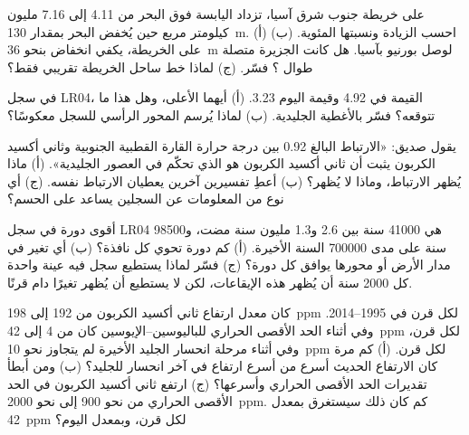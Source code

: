 \begin{exercise}[$\star\star$]\label{exo:g12:past-climates:9}
على خريطة جنوب شرق آسيا، تزداد اليابسة فوق البحر من 4.11 إلى
7.16 مليون كيلومتر مربع حين يُخفض البحر بمقدار \qty{130}{m}.
(أ) احسب الزيادة ونسبتها المئوية. (ب) على الخريطة، يكفي انخفاض بنحو
\qty{36}{m} لوصل بورنيو بآسيا. هل كانت الجزيرة متصلة طوال ؟ فسّر. (ج) لماذا خط ساحل الخريطة تقريبي
فقط؟
\end{exercise}

\begin{exercise}[$\star\star$]\label{exo:g12:past-climates:10}
في سجل LR04، القيمة في 
\qty{4.92}{\permil} وقيمة اليوم \qty{3.23}{\permil}. (أ) أيهما الأعلى،
وهل هذا ما تتوقعه؟ فسّر بالأغطية الجليدية. (ب) لماذا يُرسم
المحور الرأسي للسجل معكوسًا؟
\end{exercise}

\begin{exercise}[$\star\star$]\label{exo:g12:past-climates:11}
يقول صديق: «الارتباط البالغ 0.92 بين درجة حرارة القارة القطبية الجنوبية
وثاني أكسيد الكربون يثبت أن ثاني أكسيد الكربون هو الذي تحكّم في العصور الجليدية».
(أ) ماذا يُظهر الارتباط، وماذا لا يُظهر؟ (ب) أعطِ تفسيرين
آخرين يعطيان الارتباط نفسه. (ج) أي نوع من
المعلومات عن السجلين يساعد على الحسم؟
\end{exercise}

\begin{exercise}[$\star\star\star$]\label{exo:g12:past-climates:12}
أقوى دورة في سجل LR04 هي \num{41000} سنة بين 2.6
و1.3 مليون سنة مضت، و\num{98500} سنة على مدى \num{700000} السنة
الأخيرة. (أ) كم دورة تحوي كل نافذة؟ (ب) أي تغير في
مدار الأرض أو محورها يوافق كل دورة؟ (ج) فسّر لماذا يستطيع سجل فيه
عينة واحدة كل \num{2000} سنة أن يُظهر هذه الإيقاعات، لكن لا يستطيع أن يُظهر تغيرًا
دام قرنًا.
\end{exercise}

\begin{exercise}[$\star\star\star$]\label{exo:g12:past-climates:13}
كان معدل ارتفاع ثاني أكسيد الكربون من 192 إلى \qty{198}{ppm} لكل قرن في
1995--2014. وفي أثناء الحد الأقصى الحراري للباليوسين--الإيوسين كان من 4 إلى
\qty{42}{ppm} لكل قرن، وفي أثناء مرحلة انحسار الجليد الأخيرة لم يتجاوز
نحو \qty{10}{ppm} لكل قرن. (أ) كم مرة كان الارتفاع الحديث أسرع
من أسرع ارتفاع في آخر انحسار للجليد؟ (ب) ومن أبطأ تقديرات
الحد الأقصى الحراري وأسرعها؟ (ج) ارتفع ثاني أكسيد الكربون في الحد الأقصى الحراري من نحو 900 إلى نحو
\qty{2000}{ppm}. كم كان ذلك سيستغرق بمعدل \qty{42}{ppm} لكل قرن،
وبمعدل اليوم؟
\end{exercise}

